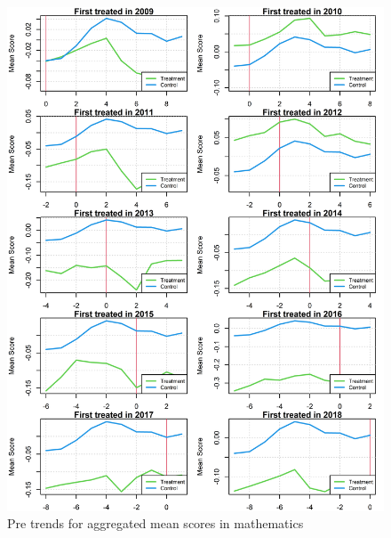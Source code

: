 \begin{figure}[!h]
	\centering
	\includegraphics[scale=1]{"../Code & Data/ParTrendsPlotMathematics.png"}
	\caption{Pre trends for aggregated mean scores in mathematics}
	\label{PreTrendsMath}
\end{figure}

